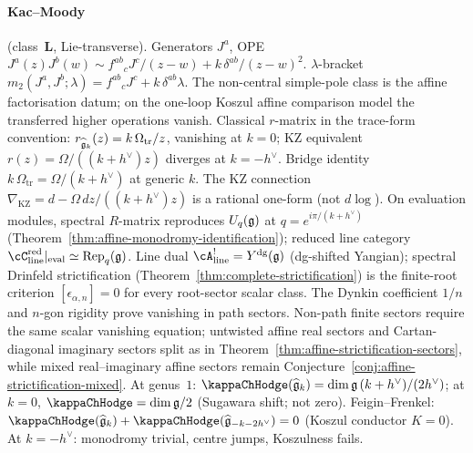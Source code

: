 \paragraph{Kac--Moody} (class~$\mathbf{L}$, Lie-transverse).
Generators $J^a$, OPE
$J^a(z)J^b(w) \sim f^{ab}{}_c J^c/(z-w) + k\,\delta^{ab}/(z-w)^2$.
$\lambda$-bracket
$m_2(J^a, J^b;\lambda) = f^{ab}{}_c J^c + k\,\delta^{ab}\lambda$.
The non-central simple-pole class is the affine factorisation datum;
on the one-loop Koszul affine comparison model the transferred higher
operations vanish.
Classical $r$-matrix in the trace-form convention:
$r_{\widehat{\mathfrak{g}}_k}(z) = k\,\Omega_{\mathrm{tr}}/z$, vanishing at $k = 0$;
KZ equivalent $r(z) = \Omega/((k+h^\vee)z)$ diverges at
$k = -h^\vee$. Bridge identity $k\,\Omega_{\mathrm{tr}} =
\Omega/(k+h^\vee)$ at generic $k$. The KZ connection
$\nabla_{\mathrm{KZ}} = d - \Omega\,dz/((k+h^\vee)z)$
is a rational one-form (not $d\log$). On evaluation modules,
spectral $R$-matrix reproduces $U_q(\mathfrak{g})$ at
$q = e^{i\pi/(k+h^\vee)}$
(Theorem~\ref{thm:affine-monodromy-identification});
reduced line category
$\cC_{\mathrm{line}}^{\mathrm{red}}|_{\mathrm{eval}} \simeq
\operatorname{Rep}_q(\fg)$.
Line dual $\cA^!_{\mathrm{line}} = \Ydg(\fg)$ (dg-shifted
Yangian); spectral Drinfeld strictification
(Theorem~\ref{thm:complete-strictification}) is the finite-root
criterion $[\epsilon_{\alpha,n}]=0$ for every root-sector scalar
class. The Dynkin coefficient $1/n$ and $n$-gon rigidity prove
vanishing in path sectors. Non-path finite sectors require the same
scalar vanishing equation; untwisted affine real sectors and
Cartan-diagonal imaginary sectors split as in
Theorem~\ref{thm:affine-strictification-sectors}, while mixed
real--imaginary affine sectors remain
Conjecture~\ref{conj:affine-strictification-mixed}.
At genus~$1$: $\kappaChHodge(\widehat{\fg}_k) =
\dim\fg\,(k+h^\vee)/(2h^\vee)$; at $k = 0$,
$\kappaChHodge = \dim\fg/2$ (Sugawara shift; not zero).
Feigin--Frenkel:
$\kappaChHodge(\widehat{\fg}_k) +
\kappaChHodge(\widehat{\fg}_{-k-2h^\vee}) = 0$ (Koszul
conductor $K = 0$). At $k = -h^\vee$: monodromy trivial, centre
jumps, Koszulness fails.

